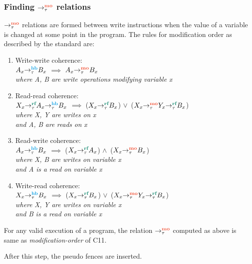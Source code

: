 \subsubsection{Finding $\setMO$ relations}
$\setMO$ relations are formed between write instructions when the value of a 
variable is changed at some point in the program. The rules for modification 
order as described by the standard \cite{C11} are:
\begin{enumerate}
    \item Write-write coherence: \\
    $\hb{\tau}{A_x}{B_x}$ $\implies$ $\mo{\tau}{A_x}{B_x}$\\
    \textit{where A, B are write operations modifying variable x}
    
    \item Read-read coherence:\\
    $\hb{\tau}{\rf{\tau}{X_x}{A_x}}{B_x}$ $\implies$ ($\rf{\tau}{X_x}{B_x}$) $\lor$\ ($\rf{\tau}{\mo{\tau}{X_x}{Y_x}}{B_x}$)\\
    \textit{where X, Y are writes on x\\ and A, B are reads on x}
    
    \item Read-write coherence:\\
    $\hb{\tau}{A_x}{B_x}$ $\implies$ ($\rf{\tau}{X_x}{A_x}$) $\land$\ ($\mo{\tau}{X_x}{B_x}$)\\
    \textit{where X, B are writes on variable x\\and A is a read on variable x}
    
    \item Write-read coherence:\\
    $\hb{\tau}{X_x}{B_x}$ $\implies$ ($\rf{\tau}{X_x}{B_x}$) $\lor$\ ($\rf{\tau}{\mo{\tau}{X_x}{Y_x}}{B_x}$)\\
    \textit{where X, Y are writes on variable x\\and B is a read on variable x}
\end{enumerate}

\begin{lemma}
	For any valid execution of a program, the relation $\setMO$ computed 
	as above is same as \emph{modification-order} of C11.
\end{lemma}

\par
After this step, the pseudo fences are inserted.

